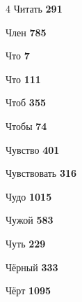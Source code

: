 \begin{multicols}{4}
\noindent Читать \dotfill \textbf{\color{secondary} 291}\par
\noindent Член \dotfill \textbf{\color{secondary} 785}\par
\noindent Что \dotfill \textbf{\color{secondary} 7}\par
\noindent Что \dotfill \textbf{\color{secondary} 111}\par
\noindent Чтоб \dotfill \textbf{\color{secondary} 355}\par
\noindent Чтобы \dotfill \textbf{\color{secondary} 74}\par
\noindent Чувство \dotfill \textbf{\color{secondary} 401}\par
\noindent Чувствовать \dotfill \textbf{\color{secondary} 316}\par
\noindent Чудо \dotfill \textbf{\color{secondary} 1015}\par
\noindent Чужой \dotfill \textbf{\color{secondary} 583}\par
\noindent Чуть \dotfill \textbf{\color{secondary} 229}\par
\noindent Чёрный \dotfill \textbf{\color{secondary} 333}\par
\noindent Чёрт \dotfill \textbf{\color{secondary} 1095}\par


\end{multicols}
